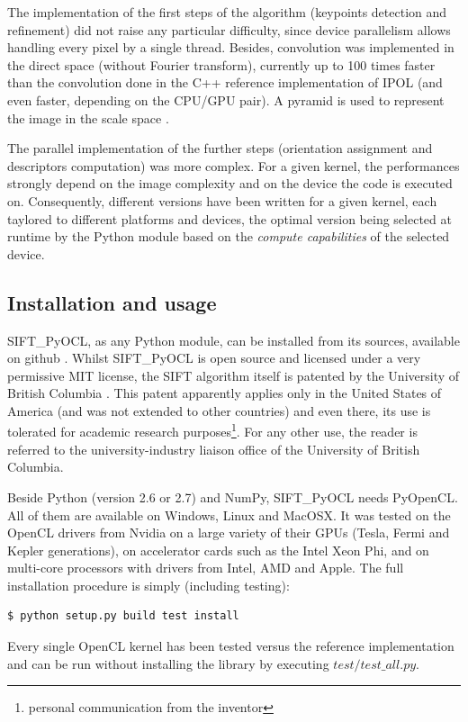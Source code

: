 \documentclass[preprint]{iucr}
\begin{document}
The implementation of the first steps of the algorithm (keypoints detection and
refinement) did not raise any particular difficulty, since device parallelism
allows handling every pixel by a single thread.
Besides, convolution was implemented in the direct space (without Fourier
transform), currently up to 100 times faster than the convolution done in
the C++ reference implementation of IPOL \cite{ASIFT}
(and even faster, depending on the CPU/GPU pair).
A pyramid is used to represent the image in the scale space \cite{Lowe04}.

The parallel implementation of the further steps (orientation assignment and
descriptors computation) was more complex.
For a given kernel, the performances strongly depend on the image
complexity and on the device the code is executed on.
Consequently, different versions have been written for a given kernel, each
taylored to different platforms and
devices, the optimal version being selected at runtime by the
Python module based on the \emph{compute capabilities} of the selected device.


\subsection{Installation and usage}
SIFT\_PyOCL, as any Python module, can be installed from its sources,
available on github \cite{sift_pyocl}.
Whilst SIFT\_PyOCL is open source and licensed under a very
permissive MIT license, the SIFT algorithm itself is
patented by the University of British Columbia \cite{SIFT_pat}.
This patent apparently applies only in the United States of America
(and was not extended to other countries) and even there, its use is
tolerated for academic research purposes\footnote{personal communication from the
inventor}. For any other use, the reader is referred to the
university-industry liaison office of the University of British Columbia.

Beside Python (version 2.6 or 2.7) and NumPy, SIFT\_PyOCL needs
PyOpenCL. All of them are available on Windows, Linux and MacOSX.
It was tested on the OpenCL drivers from Nvidia on a
large variety of their GPUs (Tesla, Fermi and Kepler generations), on
accelerator cards such as the Intel Xeon Phi,  and on multi-core processors
with drivers from Intel, AMD and Apple.
The full installation procedure is simply (including testing):
\begin{verbatim}
$ python setup.py build test install
\end{verbatim}
Every single OpenCL kernel has been tested versus the reference
implementation and can be run without installing the library by
executing $test/test\_all.py$.
\end{document}
